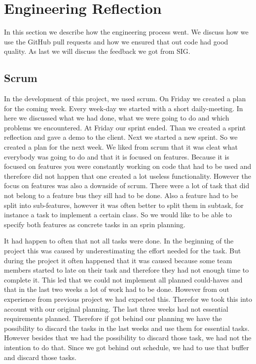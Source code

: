 \chapter{Engineering Reflection} %

In this section we describe how the engineering process went. We discuss how we use the GitHub pull requests and how we ensured that out code had good quality. As last we will discuss the feedback we got from SIG.

\section{Scrum}
In the development of this project, we used scrum. On Friday we created a plan for the coming week. Every week-day we started with a short daily-meeting. In here we discussed what we had done, what we were going to do and which problems we encountered. At Friday our sprint ended. Than we created a sprint reflection and gave a demo to the client. Next we started a new sprint. So we created a plan for the next week.
We liked from scrum that it was cleat what everybody was going to do and that it is focused on features. Because it is focused on features you were constantly working on code that had to be used and therefore did not happen that one created a lot useless functionality. However the focus on features was also a downside of scrum. There were a lot of task that did not belong to a feature bus they sill had to be done. Also a feature had to be split into sub-features, however it was often better to split them in subtask, for instance a task to implement a certain class. So we would like to be able to specify both features as concrete tasks in an sprin planning.

It had happen to often that not all tasks were done. In the beginning of the project this was caused by underestimating the effort needed for the task. But during the project it often happened that it was caused because some team members started to late on their task and therefore they had not enough time to complete it. This led that we could not implement all planned could-haves and that in the last two weeks a lot of work had to be done. However from out experience from previous project we had expected this. Therefor we took this into account with our original planning. The last three weeks had not essential requirements planned. Therefore if got behind our planning we have the possibility to discard the tasks in the last weeks and use them for essential tasks. However besides that we had the possibility to discard those task, we had not the intention to do that. Since we got behind out schedule, we had to use that buffer and discard those tasks.

